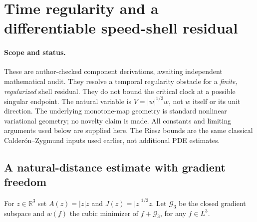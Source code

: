 \section{Time regularity and a differentiable speed-shell residual}
\label{st:section}

\paragraph{Scope and status.}
These are author-checked component derivations, awaiting independent
mathematical audit. They resolve a temporal regularity obstacle for a
\emph{finite, regularized} shell residual. They do not bound the critical
clock at a possible singular endpoint. The natural variable is
$V=|w|^{1/2}w$, not $w$ itself or its unit direction. The underlying
monotone-map geometry is standard nonlinear variational geometry; no
novelty claim is made. All constants and limiting arguments used below
are supplied here. The Riesz bounds are the same classical
Calder\'on--Zygmund inputs used earlier, not additional PDE estimates.

\subsection{A natural-distance estimate with gradient freedom}

For $z\in\mathbb R^3$ set $A(z)=|z|z$ and $J(z)=|z|^{1/2}z$.
Let $\mathcal G_3$ be the closed gradient subspace and $w(f)$ the cubic
minimizer of $f+\mathcal G_3$, for any $f\in L^3$.

